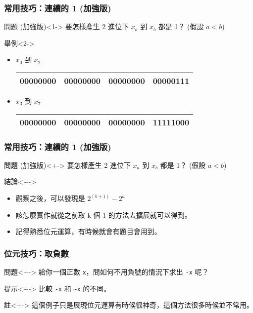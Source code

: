 \documentclass[utf8]{beamer}
\begin{document}
\begin{CJK}{UTF8}{bkai}
\begin{frame}[fragile]
  \frametitle{常用技巧：連續的 1 (加強版)}
  \begin{block}{問題 \alert{(加強版)}}<1->
  要怎樣產生 2 進位下 $x_a$ 到 $x_b$ 都是 1？ (假設 $a<b$)
  \end{block}
  \begin{exampleblock}{舉例}<2->
    \begin{itemize}
    \item $x_0$ 到 $x_2$ 
      \begin{table}[h]
        \begin{tabular}{|c|c|c|c|}
        \hline
        00000000 & 00000000 & 00000000 & 00000\alert{111}\\
        \hline
        \end{tabular}
      \end{table}
    \item<4-> $x_3$ 到 $x_7$
      \begin{table}[h]
        \begin{tabular}{|c|c|c|c|}
        \hline
        00000000 & 00000000 & 00000000 & \alert{11111}000\\
        \hline
        \end{tabular}
      \end{table}
    \end{itemize}
  \end{exampleblock}
\end{frame}

\begin{frame}[fragile]
  \frametitle{常用技巧：連續的 1 (加強版)}
  \begin{block}{問題 \alert{(加強版)}}<+->
  要怎樣產生 2 進位下 $x_a$ 到 $x_b$ 都是 1？ (假設 $a<b$)
  \end{block}
  \begin{alertblock}{結論}<+->
    \begin{itemize}
    \item 觀察之後，可以發現是 $2^(b+1)-2^a$
    \item<+-> 該怎麼實作就從之前取 k 個 1 的方法去擴展就可以得到。
    \item<+-> 記得熟悉位元運算，有時候就會有題目會用到。
    \end{itemize}
  \end{alertblock}
\end{frame}

\begin{frame}[fragile]
  \frametitle{位元技巧：取負數}
  \begin{alertblock}{問題}<+->
  給你一個正數 \lstinline{x}{}，問如何不用負號的情況下求出 \lstinline{-x}{} 呢？
  \end{alertblock}
  \begin{block}{提示}<+->
  比較 \lstinline{-x}{} 和 \lstinline{~x}{} 的不同。
  \end{block}
  \begin{exampleblock}{註}<+->
  這個例子只是展現位元運算有時候很神奇，這個方法很多時候並不常用。
  \end{exampleblock}
\end{frame}


\end{CJK}
\end{document}
